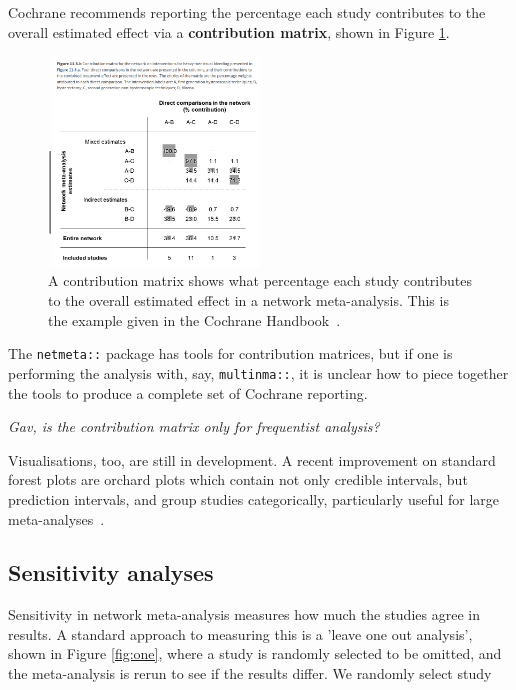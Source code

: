 \documentclass[12pt]{article}\usepackage[]{graphicx}\usepackage[]{color}
\newcommand{\package}[1]{\texttt{{#1::}}}
\begin{document}

Cochrane recommends reporting the percentage each study contributes to the overall estimated effect via a \textbf{contribution matrix}, shown in Figure \ref{fig:cmatrix}.

\begin{figure}
\centering
\includegraphics[width=0.5\textwidth]{contribution-matrix}
\caption{A contribution matrix shows what percentage each study contributes to the overall estimated effect in a network meta-analysis. This is the example given in the Cochrane Handbook~\cite{higgins2019cochrane}.}
\label{fig:cmatrix}
\end{figure}

The \package{netmeta} package has tools for contribution matrices, but if one is performing the analysis with, say, \package{multinma}, it is unclear how to piece together the tools to produce a complete set of Cochrane reporting.

\emph{Gav, is the contribution matrix only for frequentist analysis?}

Visualisations, too, are still in development. A recent improvement on standard forest plots are orchard plots which contain not only credible intervals, but prediction intervals, and group studies categorically, particularly useful for large meta-analyses~\cite{nakagawa_orchard_2021}.

\subsection{Sensitivity analyses}





Sensitivity in network meta-analysis measures how much the studies agree in results. A standard approach to measuring this is a 'leave one out analysis', shown in Figure \ref{fig:one}, where a study is randomly selected to be omitted, and the meta-analysis is rerun to see if the results differ. We randomly select study %
\end{document}
